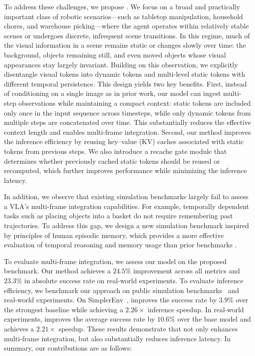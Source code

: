 To address these challenges, we propose \dysta{}. We focus on a broad and practically important class of robotic scenarios—such as tabletop manipulation, household chores, and warehouse picking—where the agent operates within relatively stable scenes or undergoes discrete, infrequent scene transitions. In this regime, much of the visual information in a scene remains static or changes slowly over time: the background, objects remaining still, and even moved objects whose visual appearances stay largely invariant. Building on this observation, we explicitly disentangle visual tokens into dynamic tokens and multi-level static tokens with different temporal persistence. This design yields two key benefits. First, instead of conditioning on a single image as in prior work, our model can ingest multi-step observations while maintaining a compact context: static tokens are included only once in the input sequence across timesteps, while only dynamic tokens from multiple steps are concatenated over time. This substantially reduces the effective context length and enables multi-frame integration. Second, our method improves the inference efficiency by reusing key–value (KV) caches associated with static tokens from previous steps. We also introduce a recache gate module that determines whether previously cached static tokens should be reused or recomputed, which further improves performance while minimizing the inference latency.

In addition, we observe that existing simulation benchmarks largely fail to assess a VLA's multi-frame integration capabilities. For example, temporally dependent tasks such as placing objects into a basket do not require remembering past trajectories. To address this gap, we design a new simulation benchmark inspired by principles of human episodic memory, which provides a more effective evaluation of temporal reasoning and memory usage than prior benchmarks \citep{liu2023libero,li2024evaluating}.

To evaluate multi-frame integration, we assess our model on the proposed benchmark. Our method achieves a $24.5\%$ improvement across all metrics and $23.3\%$ in absolute success rate on real-world experiments. To evaluate inference efficiency, we benchmark our approach on public simulation benchmarks~\citep{liu2023libero,li2024evaluating} and real-world experiments. On SimplerEnv~\citep{li2024evaluating}, \dysta{} improves the success rate by $3.9\%$ over the strongest baseline while achieving a $2.26\times$ inference speedup. In real-world experiments, \dysta{} improves the average success rate by $10.6\%$ over the base model and achieves a $2.21\times$ speedup. These results demonstrate that \dysta{} not only enhances multi-frame integration, but also substantially reduces inference latency. In summary, our contributions are as follows:

